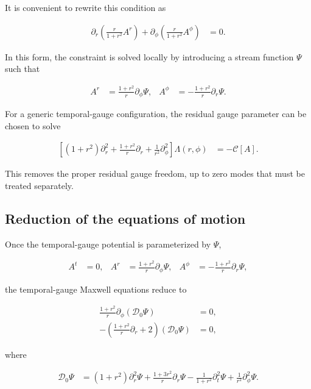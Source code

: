 It is convenient to rewrite this condition as

\begin{align}
\partial_{r}\left(\frac{r}{1+r^{2}}A^{r}\right)+\partial_{\phi}\left(\frac{r}{1+r^{2}}A^{\phi}\right)&=0.
\end{align}

In this form, the constraint is solved locally by introducing a stream function $\Psi$ such that

\begin{align}
A^{r}&=\frac{1+r^{2}}{r}\partial_{\phi}\Psi, &
A^{\phi}&=-\frac{1+r^{2}}{r}\partial_{r}\Psi.
\end{align}

For a generic temporal-gauge configuration, the residual gauge parameter can be chosen to solve

\begin{align}
\left[(1+r^{2})\partial_{r}^{2}+\frac{1+r^{2}}{r}\partial_{r}+\frac{1}{r^{2}}\partial_{\phi}^{2}\right]\Lambda(r,\phi)&=-\mathcal{C}[A].
\end{align}

This removes the proper residual gauge freedom, up to zero modes that must be treated separately.

\subsection{Reduction of the equations of motion}\label{subsec:app-eom-reduction}

Once the temporal-gauge potential is parameterized by $\Psi$,

\begin{align}
A^{t}&=0, &
A^{r}&=\frac{1+r^{2}}{r}\partial_{\phi}\Psi, &
A^{\phi}&=-\frac{1+r^{2}}{r}\partial_{r}\Psi,
\end{align}

the temporal-gauge Maxwell equations reduce to

\begin{align}
\frac{1+r^{2}}{r}\partial_{\phi}(\mathcal{D}_{0}\Psi)&=0, \\
-\left(\frac{1+r^{2}}{r}\partial_{r}+2\right)(\mathcal{D}_{0}\Psi)&=0,
\end{align}

where

\begin{align}
\mathcal{D}_{0}\Psi&=(1+r^{2})\partial_{r}^{2}\Psi+\frac{1+3r^{2}}{r}\partial_{r}\Psi-\frac{1}{1+r^{2}}\partial_{t}^{2}\Psi+\frac{1}{r^{2}}\partial_{\phi}^{2}\Psi.
\end{align}

